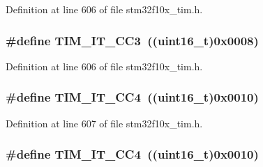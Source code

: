 Definition at line 606 of file stm32f10x\+\_\+tim.\+h.

\subsubsection[{\texorpdfstring{T\+I\+M\+\_\+\+I\+T\+\_\+\+C\+C3}{TIM_IT_CC3}}]{\setlength{\rightskip}{0pt plus 5cm}\#define T\+I\+M\+\_\+\+I\+T\+\_\+\+C\+C3~(({\bf uint16\+\_\+t})0x0008)}\hypertarget{group___t_i_m__interrupt__sources_ga6aef020aebafd9e585283fbbaf8b841f}{}\label{group___t_i_m__interrupt__sources_ga6aef020aebafd9e585283fbbaf8b841f}


Definition at line 606 of file stm32f10x\+\_\+tim.\+h.

\subsubsection[{\texorpdfstring{T\+I\+M\+\_\+\+I\+T\+\_\+\+C\+C4}{TIM_IT_CC4}}]{\setlength{\rightskip}{0pt plus 5cm}\#define T\+I\+M\+\_\+\+I\+T\+\_\+\+C\+C4~(({\bf uint16\+\_\+t})0x0010)}\hypertarget{group___t_i_m__interrupt__sources_ga1dce7f1bc32a258f2964cb7c05f413a6}{}\label{group___t_i_m__interrupt__sources_ga1dce7f1bc32a258f2964cb7c05f413a6}


Definition at line 607 of file stm32f10x\+\_\+tim.\+h.

\subsubsection[{\texorpdfstring{T\+I\+M\+\_\+\+I\+T\+\_\+\+C\+C4}{TIM_IT_CC4}}]{\setlength{\rightskip}{0pt plus 5cm}\#define T\+I\+M\+\_\+\+I\+T\+\_\+\+C\+C4~(({\bf uint16\+\_\+t})0x0010)}\hypertarget{group___t_i_m__interrupt__sources_ga1dce7f1bc32a258f2964cb7c05f413a6}{}\label{group___t_i_m__interrupt__sources_ga1dce7f1bc32a258f2964cb7c05f413a6}


